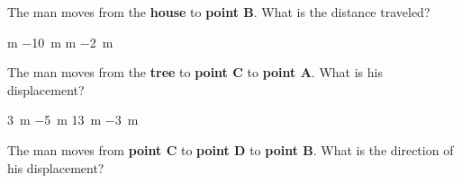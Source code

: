 \documentclass[answers]{exam}
\begin{document}
\begin{questions}
\begin{questions}

\question
The man moves from the \textbf{house} to \textbf{point B}. What is the distance traveled?

\begin{choices}
 m
\choice \SI{-10}{m}
 m
\choice \SI{-2}{m}
\end{choices}

\question
The man moves from the \textbf{tree} to \textbf{point C} to \textbf{point A}. What is his displacement?

\begin{choices}
\CorrectChoice \SI{3}{m}
\choice \SI{-5}{m}
\choice \SI{13}{m}
\choice \SI{-3}{m}
\end{choices}

\question
The man moves from \textbf{point C} to \textbf{point D} to \textbf{point B}. What is the direction of his displacement?


\end{questions}
\end{questions}
\end{document}
